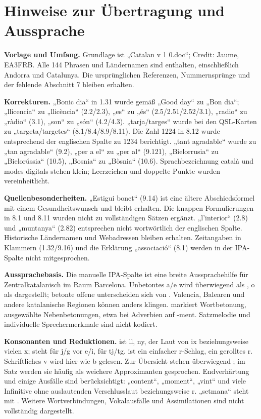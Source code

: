 \documentclass[a4paper,landscape,10pt]{article}
\newcommand{\ipa}[1]{{\ipafont[#1]}}
\begin{document}
\section*{Hinweise zur Übertragung und Aussprache}
\fontsize{8.5}{10}\selectfont\raggedright
\textbf{Vorlage und Umfang.} Grundlage ist „Catalan v 1 0.doc“; Credit: Jaume, EA3FRB.
Alle 144 Phrasen und Ländernamen sind enthalten, einschließlich Andorra und Catalunya.
Die ursprünglichen Referenzen, Nummernsprünge und der fehlende Abschnitt 7 bleiben erhalten.

\smallskip
\textbf{Korrekturen.} „Bonic dia“ in 1.31 wurde gemäß „Good day“ zu „Bon dia“; „llicencia“ zu „llicència“
(2.2/2.3), „es“ zu „és“ (2.5/2.51/2.52/3.1), „radio“ zu „ràdio“ (3.1), „son“ zu „són“ (4.2/4.3).
„tarja/targes“ wurde bei den QSL-Karten zu „targeta/targetes“ (8.1/8.4/8.9/8.11).
Die Zahl 1224 in 8.12 wurde entsprechend der englischen Spalte zu 1234 berichtigt.
„tant agradable“ wurde zu „tan agradable“ (9.2), „per a el“ zu „per al“ (9.121),
„Bielorrusia“ zu „Bielorússia“ (10.5), „Bosnia“ zu „Bòsnia“ (10.6).
Sprachbezeichnung català und modes digitals stehen klein; Leerzeichen und doppelte Punkte wurden vereinheitlicht.

\smallskip
\textbf{Quellenbesonderheiten.} „Estigui bonet“ (9.14) ist eine ältere Abschiedsformel mit einem
Gesundheitswunsch und bleibt erhalten. Die knappen Formulierungen in 8.1 und 8.11 wurden nicht zu vollständigen
Sätzen ergänzt. „l’interior“ (2.8) und „muntanya“ (2.82) entsprechen nicht wortwörtlich der englischen Spalte.
Historische Ländernamen und Webadressen bleiben erhalten. Zeitangaben in Klammern (1.32/9.16) und die
Erklärung „associació“ (8.1) werden in der IPA-Spalte nicht mitgesprochen.

\smallskip
\textbf{Aussprachebasis.} Die manuelle IPA-Spalte ist eine breite Aussprachehilfe für Zentralkatalanisch
im Raum Barcelona. Unbetontes a/e wird überwiegend als \ipa{ə}, o als \ipa{u} dargestellt; betonte offene
\ipa{ɛ, ɔ} unterscheiden sich von \ipa{e, o}. Valencia, Balearen und andere katalanische Regionen können anders klingen.
\ipa{ˈ} markiert Wortbetonung, \ipa{ˌ} ausgewählte Nebenbetonungen, etwa bei Adverbien auf -ment.
Satzmelodie und individuelle Sprechermerkmale sind nicht kodiert.

\smallskip
\textbf{Konsonanten und Reduktionen.} \ipa{ʎ} ist ll, \ipa{ɲ} ny, \ipa{ʃ} der Laut von ix beziehungsweise vielen x;
\ipa{ʒ} steht für j/g vor e/i, \ipa{dʒ} für tj/tg. \ipa{ɾ} ist ein einfacher r-Schlag, \ipa{r} ein gerolltes r.
Schriftliches v wird hier wie b gelesen. Zur Übersicht stehen überwiegend \ipa{b, d, ɡ}; im Satz werden sie häufig
als weichere Approximanten \ipa{β, ð, ɣ} gesprochen. Endverhärtung und einige Ausfälle sind berücksichtigt:
„content“, „moment“, „vint“ und viele Infinitive ohne auslautenden Verschlusslaut beziehungsweise r.
„setmana“ steht mit \ipa{mː}. Weitere Wortverbindungen, Vokalausfälle und Assimilationen sind nicht vollständig dargestellt.
\end{document}
